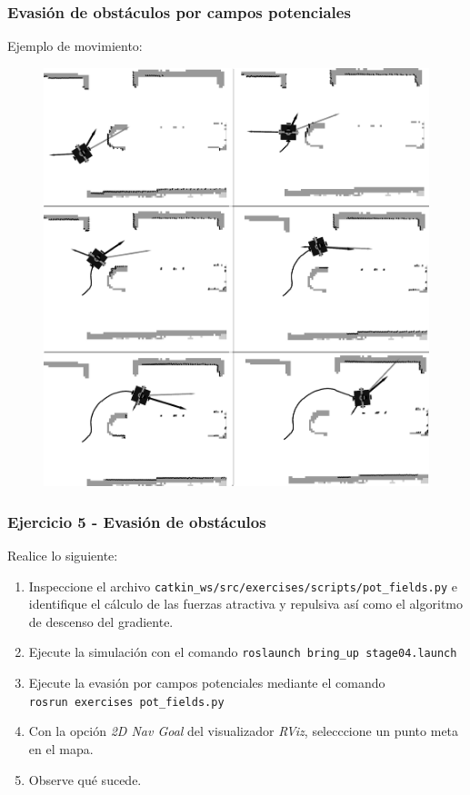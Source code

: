 \documentclass[10pt,spanish,aspectratio=1610]{beamer}
\begin{document}
\begin{frame}\frametitle{Evasión de obstáculos por campos potenciales}
  Ejemplo de movimiento:
  \begin{figure}
    \centering
    \includegraphics[height=0.85\textheight]{Figures/PotFieldsExecution.png}
  \end{figure}
\end{frame}

\begin{frame}[containsverbatim]\frametitle{Ejercicio 5 - Evasión de obstáculos}
Realice lo siguiente:
  \begin{enumerate}
     \item Inspeccione el archivo \texttt{catkin\_ws/src/exercises/scripts/pot\_fields.py} e identifique el cálculo de las fuerzas atractiva y repulsiva así como el algoritmo de descenso del gradiente.  
  \item Ejecute la simulación con el comando \texttt{roslaunch bring\_up stage04.launch}
  \item Ejecute la evasión por campos potenciales mediante el comando\\ \texttt{rosrun exercises pot\_fields.py}
  \item Con la opción \textit{2D Nav Goal} del visualizador \textit{RViz}, selecccione un punto meta en el mapa.
  \item Observe qué sucede. 
  \end{enumerate}
\end{frame}
\end{document}
